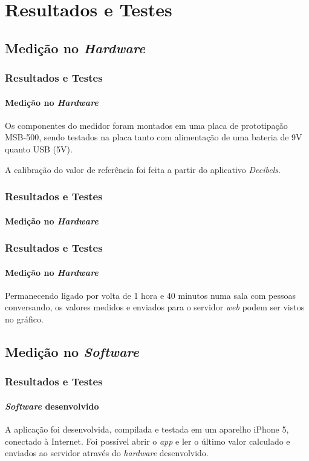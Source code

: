 \documentclass[brazil]{beamer}
\begin{document}

	\section{Resultados e Testes}

	\subsection{Medição no {\it Hardware}}

	\begin{frame}
		\frametitle{Resultados e Testes}
		\framesubtitle{Medição no {\it Hardware}}
		\vspace{0.5cm}
		Os componentes do medidor foram montados em uma placa de prototipação MSB-500, sendo testados na placa tanto com alimentação de uma bateria de 9V quanto USB (5V).

		\vspace{1cm}
		
		A calibração do valor de referência foi feita a partir do aplicativo {\it Decibels}.
	\end{frame}

	\begin{frame}
		\frametitle{Resultados e Testes}
		\framesubtitle{Medição no {\it Hardware}}
	\end{frame}

	\begin{frame}
		\frametitle{Resultados e Testes}
		\framesubtitle{Medição no {\it Hardware}}
		\vspace{0.2cm}
		\footnotesize{Permanecendo ligado por volta de 1 hora e 40 minutos numa sala com pessoas conversando, os valores medidos e enviados para o servidor {\it web} podem ser vistos no gráfico.}
	\end{frame}

	\subsection{Medição no {\it Software}}

	\begin{frame}
		\frametitle{Resultados e Testes}
		\framesubtitle{{\it Software} desenvolvido}
		\footnotesize{A aplicação foi desenvolvida, compilada e testada em um aparelho iPhone 5, conectado à Internet. Foi possível abrir o {\it app} e ler o último valor calculado e enviados ao servidor através do {\it hardware} desenvolvido.}

	\end{frame}
\end{document}
